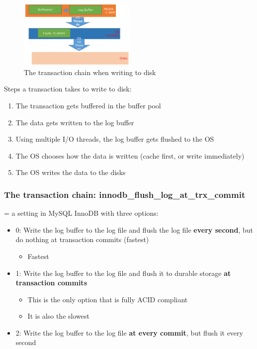 \documentclass{article}
\begin{document}
\begin{figure}[H]
    \centering
    \includegraphics[width=0.5\textwidth]{transaction-chain.png}
    \caption{The transaction chain when writing to disk}
\end{figure}

Steps a transaction takes to write to disk:

\begin{enumerate}
    \item The transaction gets buffered in the buffer pool
    \item The data gets written to the log buffer
    \item Using multiple I/O threads, the log buffer gets flushed to the OS
    \item The OS chooses how the data is written (cache first, or write immediately)
    \item The OS writes the data to the disks
\end{enumerate}

\subsubsection{The transaction chain: innodb\_flush\_log\_at\_trx\_commit}

= a setting in MySQL InnoDB with three options:

\begin{itemize}
    \item 0: Write the log buffer to the log file and flush the log file \textbf{every second}, but do nothing at transaction commits (fastest)
    \begin{itemize}
        \item Fastest
    \end{itemize}
    \item 1: Write the log buffer to the log file and flush it to durable storage \textbf{at transaction commits}
    \begin{itemize}
        \item This is the only option that is fully ACID compliant
        \item It is also the slowest
    \end{itemize}
    \item 2: Write the log buffer to the log file \textbf{at every commit}, but flush it every second
\end{itemize}
\end{document}
